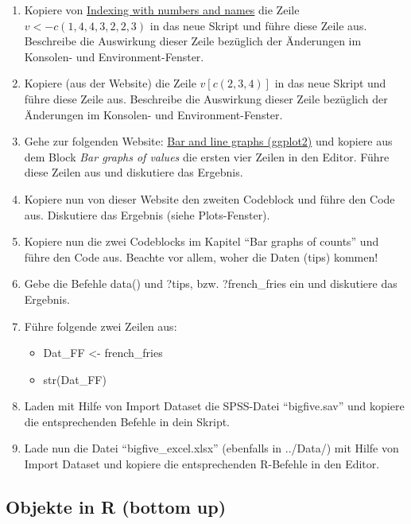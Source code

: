 \documentclass[]{article}
\providecommand{\tightlist}{%
  \setlength{\itemsep}{0pt}\setlength{\parskip}{0pt}}
\begin{document}
\begin{enumerate}
\def\labelenumi{\arabic{enumi}.}
\tightlist
\item
  Kopiere von
  \href{http://www.cookbook-r.com/Basics/Indexing_into_a_data_structure/}{Indexing
  with numbers and names} die Zeile \(v <- c(1,4,4,3,2,2,3)\) in das
  neue Skript und führe diese Zeile aus. Beschreibe die Auswirkung
  dieser Zeile bezüglich der Änderungen im Konsolen- und
  Environment-Fenster.
\item
  Kopiere (aus der Website) die Zeile \(v[c(2,3,4)]\) in das neue Skript
  und führe diese Zeile aus. Beschreibe die Auswirkung dieser Zeile
  bezüglich der Änderungen im Konsolen- und Environment-Fenster.
\item
  Gehe zur folgenden Website:
  \href{http://www.cookbook-r.com/Graphs/Bar_and_line_graphs_(ggplot2)/}{Bar
  and line graphs (ggplot2)} und kopiere aus dem Block \emph{Bar graphs
  of values} die ersten vier Zeilen in den Editor. Führe diese Zeilen
  aus und diskutiere das Ergebnis.
\item
  Kopiere nun von dieser Website den zweiten Codeblock und führe den
  Code aus. Diskutiere das Ergebnis (siehe Plots-Fenster).
\item
  Kopiere nun die zwei Codeblocks im Kapitel ``Bar graphs of counts''
  und führe den Code aus. Beachte vor allem, woher die Daten (tips)
  kommen!
\item
  Gebe die Befehle data() und ?tips, bzw. ?french\_fries ein und
  diskutiere das Ergebnis.
\item
  Führe folgende zwei Zeilen aus:

  \begin{itemize}
  \tightlist
  \item
    Dat\_FF \textless{}- french\_fries
  \item
    str(Dat\_FF)
  \end{itemize}
\item
  Laden mit Hilfe von Import Dataset die SPSS-Datei ``bigfive.sav'' und
  kopiere die entsprechenden Befehle in dein Skript.
\item
  Lade nun die Datei ``bigfive\_excel.xlsx'' (ebenfalls in ../Data/) mit
  Hilfe von Import Dataset und kopiere die entsprechenden R-Befehle in
  den Editor.
\end{enumerate}

\subsection*{Objekte in R (bottom up)}\label{objekte-in-r-bottom-up}
\end{document}
